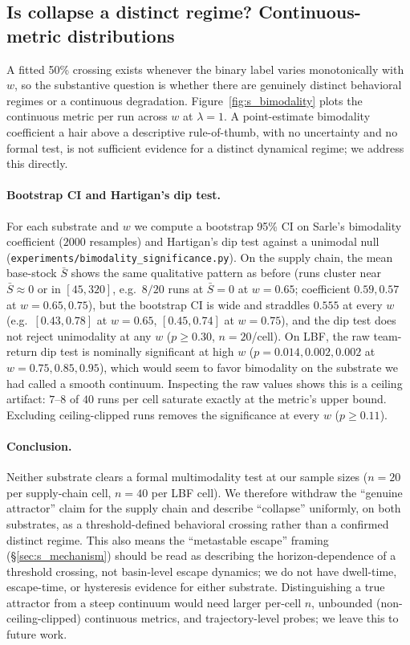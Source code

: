 \documentclass[letterpaper]{article} %
\theoremstyle{plain}
\begin{document}
\subsection{Is collapse a distinct regime? Continuous-metric distributions}
\label{sec:s_bimodality}
A fitted 50\% crossing exists whenever the binary label varies monotonically with $w$, so the
substantive question is whether there are genuinely distinct behavioral regimes or a continuous
degradation. Figure~\ref{fig:s_bimodality} plots the continuous metric per run across $w$ at
$\lambda{=}1$. A point-estimate bimodality coefficient a hair above a
descriptive rule-of-thumb, with no uncertainty and no formal test, is not sufficient evidence for a
distinct dynamical regime; we address this directly.

\paragraph{Bootstrap CI and Hartigan's dip test.} For each substrate and $w$ we compute a bootstrap
95\% CI on Sarle's bimodality coefficient ($2000$ resamples) and Hartigan's dip test against a
unimodal null (\texttt{experiments/bimodality\_significance.py}). On the supply chain, the mean
base-stock $\bar S$ shows the same qualitative pattern as before (runs cluster near $\bar S\!\approx\!0$
or in $[45,320]$, e.g.\ $8/20$ runs at $\bar S{=}0$ at $w{=}0.65$; coefficient $0.59,0.57$ at
$w{=}0.65,0.75$), but the bootstrap CI is wide and straddles $0.555$ at every $w$ (e.g.\
$[0.43,0.78]$ at $w{=}0.65$, $[0.45,0.74]$ at $w{=}0.75$), and the dip test does not reject unimodality
at any $w$ ($p\ge0.30$, $n{=}20$/cell). On LBF, the raw team-return dip test is nominally significant
at high $w$ ($p=0.014,0.002,0.002$ at $w{=}0.75,0.85,0.95$), which would seem to favor bimodality on
the substrate we had called a smooth continuum. Inspecting the raw values shows this is a ceiling
artifact: $7$--$8$ of $40$ runs per cell saturate exactly at the metric's upper bound. Excluding
ceiling-clipped runs removes the significance at every $w$ ($p\ge0.11$).

\paragraph{Conclusion.} Neither substrate clears a formal multimodality test at our sample sizes ($n{=}20$
per supply-chain cell, $n{=}40$ per LBF cell). We therefore withdraw the ``genuine attractor'' claim for
the supply chain and describe ``collapse'' uniformly, on both substrates, as a threshold-defined
behavioral crossing rather than a confirmed distinct regime. This also means the ``metastable escape''
framing (\S\ref{sec:s_mechanism}) should be read as describing the horizon-dependence of a threshold
crossing, not basin-level escape dynamics; we do not have dwell-time, escape-time, or hysteresis
evidence for either substrate. Distinguishing a true attractor from a steep continuum would need larger
per-cell $n$, unbounded (non-ceiling-clipped) continuous metrics, and trajectory-level probes; we leave
this to future work.
\end{document}

